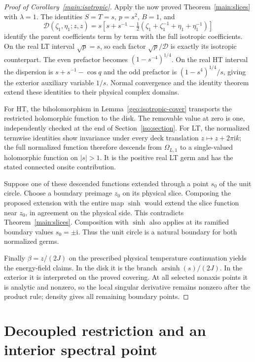 \documentclass[11pt]{article}
\numberwithin{equation}{section}
\theoremstyle{definition}
\newcommand{\ii}{\mathrm i}
\begin{document}
\begin{proof}[Proof of Corollary~\ref{main:isotropic}]
Apply the now proved Theorem~\ref{main:slices} with \(\lambda=1\).
The identities \(S=T=s\), \(p=s^2\), \(B=1\), and
\[
 \mathcal D(\zeta_1,\eta_1;z,z)
 =s\left[s+s^{-1}
 -\tfrac12(\zeta_1+\zeta_1^{-1}+\eta_1+\eta_1^{-1})\right]
\]
identify the parent coefficients term by term with the full isotropic
coefficients. On the real LT interval \(\sqrt p=s\), so each
factor \(\sqrt p/\mathcal D\) is exactly its isotropic counterpart.
The even prefactor becomes \((1-s^{-4})^{1/4}\). On the real HT
interval the dispersion is \(s+s^{-1}-\cos q\) and the odd
prefactor is \((1-s^4)^{1/4}/s\), giving the exterior auxiliary
variable \(1/s\). Normal convergence and the identity theorem
extend these identities to their physical complex domains.

For HT, the biholomorphism in Lemma~\ref{geo:isotropic-cover}
transports the restricted holomorphic function to the disk. The
removable value at zero is one, independently checked at the end
of Section~\ref{iso:section}. For LT, the normalized termwise
identities show invariance under every deck translation
\(z\mapsto z+2\pi\ii k\); the full normalized function therefore
descends from \(\Omega_{L,1}\) to a single-valued holomorphic
function on \(|s|>1\). It is the positive real LT germ and has
the stated connected onsite contribution.

Suppose one of these descended functions extended through a point
\(s_0\) of the unit circle. Choose a boundary preimage \(z_0\)
on its physical slice. Composing the proposed extension with the
entire map \(\sinh\) would extend the slice function near
\(z_0\), in agreement on the physical side. This contradicts
Theorem~\ref{main:slices}. Composition with \(\sinh\) also applies at
its ramified boundary values \(s_0=\pm\ii\). Thus the unit circle is
a natural boundary for both normalized germs.

Finally \(\beta=z/(2J)\) on the prescribed physical temperature
continuation yields the energy-field claims. In the disk it is
the branch \(\operatorname{arsinh}(s)/(2J)\). In the exterior it
is interpreted on the proved covering. At all selected nonaxis
points it is analytic and nonzero, so the local singular
derivative remains nonzero after the product rule; density gives
all remaining boundary points.
\end{proof}

\section{Decoupled restriction and an interior spectral point}
\label{main:verification}
\end{document}
